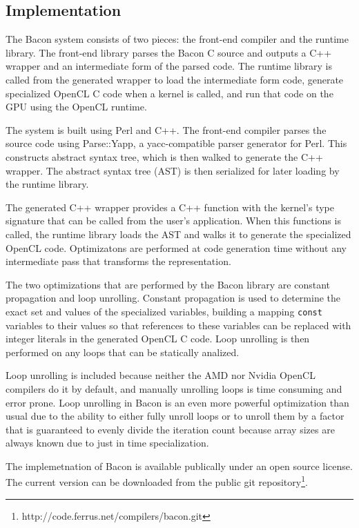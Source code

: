 \documentclass{llncs}
\begin{document}
\subsection{Implementation}

The Bacon system consists of two pieces: the front-end compiler and the
runtime library. The front-end library parses the Bacon C source and
outputs a C++ wrapper and an intermediate form of the parsed code. The
runtime library is called from the generated wrapper to load the
intermediate form code, generate specialized OpenCL C code when a
kernel is called, and run that code on the GPU using the OpenCL
runtime.

The system is built using Perl and C++. The front-end compiler parses
the source code using Parse::Yapp\cite{parse::yapp}, a yacc-compatible
parser generator for Perl. This constructs abstract syntax tree, which
is then walked to generate the C++ wrapper. The abstract syntax tree
(AST) is then serialized for later loading by the runtime library.

The generated C++ wrapper provides a C++ function with the kernel's
type signature that can be called from the user's application. When
this functions is called, the runtime library loads the AST and walks
it to generate the specialized OpenCL code. Optimizatons are performed
at code generation time without any intermediate pass that transforms
the representation.

The two optimizations that are performed by the Bacon library are
constant propagation and loop unrolling. Constant propagation is used
to determine the exact set and values of the specialized variables,
building a mapping {\tt const} variables to their values so that
references to these variables can be replaced with integer literals in
the generated OpenCL C code. Loop unrolling is then performed on any
loops that can be statically analized.

Loop unrolling is included because neither the AMD nor Nvidia OpenCL
compilers do it by default, and manually unrolling loops is time
consuming and error prone. Loop unrolling in Bacon is an even more
powerful optimization than usual due to the ability to either fully
unroll loops or to unroll them by a factor that is guaranteed to
evenly divide the iteration count because array sizes are always known
due to just in time specialization.

The implemetnation of Bacon is available publically under an open
source license. The current version can be downloaded from the public
git repository\footnote{http://code.ferrus.net/compilers/bacon.git}.
\end{document}
